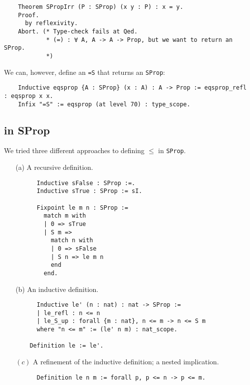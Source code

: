 \documentclass[10pt]{art}
\renewcommand{\c}{\ensuremath{(c)}}
\begin{document}
\begin{listing}[H]
  \begin{verbatim}
    Theorem SPropIrr (P : SProp) (x y : P) : x = y.
    Proof.
      by reflexivity.
    Abort. (* Type-check fails at Qed.
            * (=) : ∀ A, A -> A -> Prop, but we want to return an SProp.
            *)
  \end{verbatim}
\end{listing}

We can, however, define an \texttt{=S} that returns an \texttt{SProp}:

\begin{listing}[H]
  \begin{verbatim}
    Inductive eqsprop {A : SProp} (x : A) : A -> Prop := eqsprop_refl : eqsprop x x.
    Infix "=S" := eqsprop (at level 70) : type_scope.
  \end{verbatim}
\end{listing}

\subsection{\texorpdfstring{\leq}{<=} in SProp}
We tried three different approaches to defining $\leq$ in \texttt{SProp}.

\begin{enumerate}
  \item[(a)] A recursive definition.
    \begin{listing}[H]
      \begin{verbatim}
      Inductive sFalse : SProp :=.
      Inductive sTrue : SProp := sI.

      Fixpoint le m n : SProp :=
        match m with
        | 0 => sTrue
        | S m =>
          match n with
          | 0 => sFalse
          | S n => le m n
          end
        end.
     \end{verbatim}
    \end{listing}
  \item[(b)] An inductive definition.
    \begin{listing}[H]
      \begin{verbatim}
      Inductive le' (n : nat) : nat -> SProp :=
      | le_refl : n <= n
      | le_S_up : forall {m : nat}, n <= m -> n <= S m
      where "n <= m" := (le' n m) : nat_scope.

    Definition le := le'.
    \end{verbatim}
    \end{listing}
  \item[\c] A refinement of the inductive definition; a nested implication.
    \begin{listing}[H]
      \begin{verbatim}
      Definition le n m := forall p, p <= n -> p <= m.
      \end{verbatim}
    \end{listing}
\end{enumerate}
\end{document}
